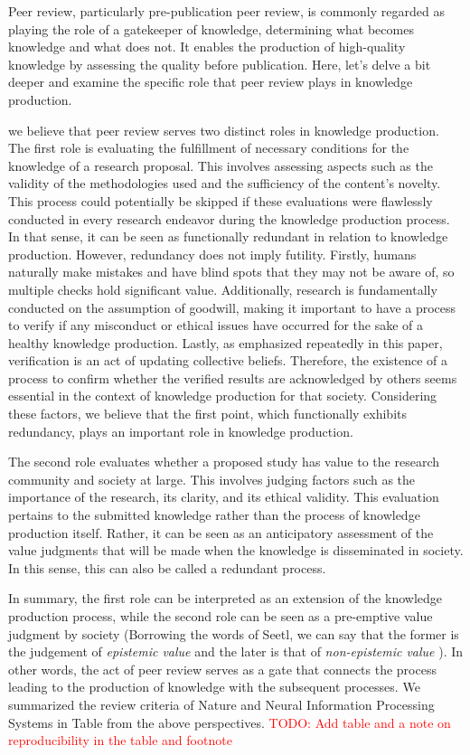 \documentclass{book}
\begin{document}
Peer review, particularly pre-publication peer review, is commonly regarded as playing the role of a gatekeeper of knowledge, determining what becomes knowledge and what does not. It enables the production of high-quality knowledge by assessing the quality before publication. Here, let's delve a bit deeper and examine the specific role that peer review plays in knowledge production.

we believe that peer review serves two distinct roles in knowledge production. The first role is evaluating the fulfillment of necessary conditions for the knowledge of a research proposal. This involves assessing aspects such as the validity of the methodologies used and the sufficiency of the content's novelty. This process could potentially be skipped if these evaluations were flawlessly conducted in every research endeavor during the knowledge production process. In that sense, it can be seen as functionally redundant in relation to knowledge production. However, redundancy does not imply futility. Firstly, humans naturally make mistakes and have blind spots that they may not be aware of, so multiple checks hold significant value. Additionally, research is fundamentally conducted on the assumption of goodwill, making it important to have a process to verify if any misconduct or ethical issues have occurred for the sake of a healthy knowledge production. Lastly, as emphasized repeatedly in this paper, verification is an act of updating collective beliefs. Therefore, the existence of a process to confirm whether the verified results are acknowledged by others seems essential in the context of knowledge production for that society. Considering these factors, we believe that the first point, which functionally exhibits redundancy, plays an important role in knowledge production.

The second role evaluates whether a proposed study has value to the research community and society at large. This involves judging factors such as the importance of the research, its clarity, and its ethical validity. This evaluation pertains to the submitted knowledge rather than the process of knowledge production itself. Rather, it can be seen as an anticipatory assessment of the value judgments that will be made when the knowledge is disseminated in society. In this sense, this can also be called a redundant process.

In summary, the first role can be interpreted as an extension of the knowledge production process, while the second role can be seen as a pre-emptive value judgment by society (Borrowing the words of Seetl, we can say that the former is the judgement of \textit{epistemic value} and the later is that of \textit{non-epistemic value} \cite{steel2010epistemic}). In other words, the act of peer review serves as a gate that connects the process leading to the production of knowledge with the subsequent processes. We summarized the review criteria of Nature and Neural Information Processing Systems in Table from the above perspectives. \textcolor{red}{TODO: Add table and a note on reproducibility in the table and footnote}
\end{document}
